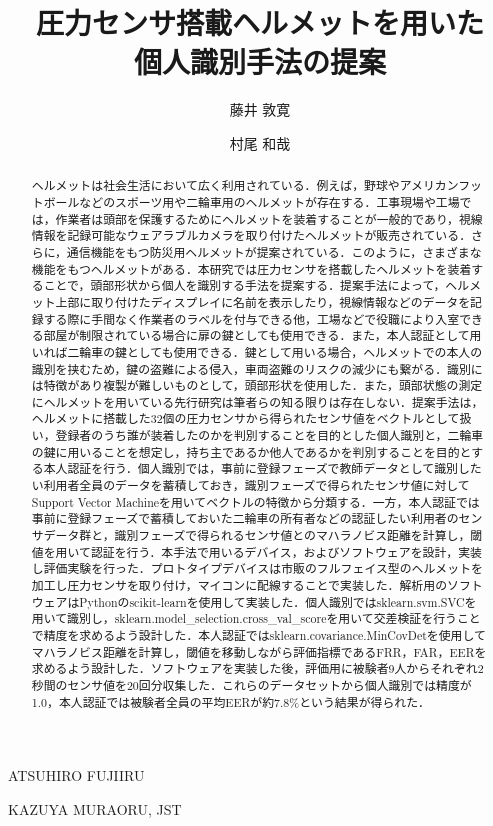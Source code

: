 \documentclass[Japanese,noauthor]{dicomopapers}
\begin{document}
\title{圧力センサ搭載ヘルメットを用いた\\個人識別手法の提案}


\author{藤井 敦寛}{ATSUHIRO FUJII}{RU}
\author{村尾 和哉}{KAZUYA MURAO}{RU, JST}

\begin{abstract}
ヘルメットは社会生活において広く利用されている．例えば，野球やアメリカンフットボールなどのスポーツ用や二輪車用のヘルメットが存在する．工事現場や工場では，作業者は頭部を保護するためにヘルメットを装着することが一般的であり，視線情報を記録可能なウェアラブルカメラを取り付けたヘルメットが販売されている．さらに，通信機能をもつ防災用ヘルメット\cite{disaster}が提案されている．このように，さまざまな機能をもつヘルメットがある．本研究では圧力センサを搭載したヘルメットを装着することで，頭部形状から個人を識別する手法を提案する．提案手法によって，ヘルメット上部に取り付けたディスプレイに名前を表示したり，視線情報などのデータを記録する際に手間なく作業者のラベルを付与できる他，工場などで役職により入室できる部屋が制限されている場合に扉の鍵としても使用できる．また，本人認証として用いれば二輪車の鍵としても使用できる．鍵として用いる場合，ヘルメットでの本人の識別を挟むため，鍵の盗難による侵入，車両盗難のリスクの減少にも繋がる．識別には特徴があり複製が難しいものとして，頭部形状を使用した．また，頭部状態の測定にヘルメットを用いている先行研究は筆者らの知る限りは存在しない．提案手法は，ヘルメットに搭載した32個の圧力センサから得られたセンサ値をベクトルとして扱い，登録者のうち誰が装着したのかを判別することを目的とした個人識別と，二輪車の鍵に用いることを想定し，持ち主であるか他人であるかを判別することを目的とする本人認証を行う．個人識別では，事前に登録フェーズで教師データとして識別したい利用者全員のデータを蓄積しておき，識別フェーズで得られたセンサ値に対してSupport Vector Machineを用いてベクトルの特徴から分類する．一方，本人認証では事前に登録フェーズで蓄積しておいた二輪車の所有者などの認証したい利用者のセンサデータ群と，識別フェーズで得られるセンサ値とのマハラノビス距離を計算し，閾値を用いて認証を行う．本手法で用いるデバイス，およびソフトウェアを設計，実装し評価実験を行った．プロトタイプデバイスは市販のフルフェイス型のヘルメットを加工し圧力センサを取り付け，マイコンに配線することで実装した．解析用のソフトウェアはPythonのscikit-learnを使用して実装した．個人識別ではsklearn.svm.SVCを用いて識別し，sklearn.model\_selection.cross\_val\_scoreを用いて交差検証を行うことで精度を求めるよう設計した．本人認証ではsklearn.covariance.MinCovDetを使用してマハラノビス距離を計算し，閾値を移動しながら評価指標であるFRR，FAR，EERを求めるよう設計した．ソフトウェアを実装した後，評価用に被験者9人からそれぞれ2秒間のセンサ値を20回分収集した．これらのデータセットから個人識別では精度が1.0，本人認証では被験者全員の平均EERが約7.8\%という結果が得られた．
\end{abstract}
\end{document}

